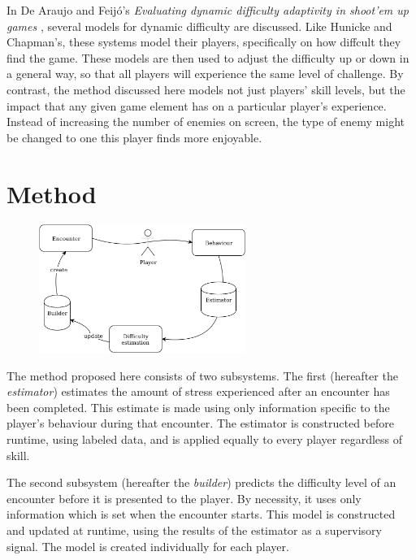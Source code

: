 \documentclass[a4paper]{article}
\begin{document}
\begin{multicols*}{2}
In De Araujo and Feij\'o's \emph{Evaluating dynamic difficulty adaptivity in shoot’em up games} \cite{shootemup}, several models for dynamic difficulty are discussed. Like Hunicke and Chapman's, these systems model their players, specifically on how diffcult they find the game. These models are then used to adjust the difficulty up or down in a general way, so that all players will experience the same level of challenge. By contrast, the method discussed here models not just players' skill levels, but the impact that any given game element has on a particular player's experience. Instead of increasing the number of enemies on screen, the type of enemy might be changed to one this player finds more enjoyable.

\section{Method}
\begin{figure}[t]
\centering
\includegraphics[width=0.60\textwidth]{processflowchart}
\end{figure}

The method proposed here consists of two subsystems. The first (hereafter the \emph{estimator}) estimates the amount of stress experienced after an encounter has been completed. This estimate is made using only information specific to the player's behaviour during that encounter. The estimator is constructed before runtime, using labeled data, and is applied equally to every player regardless of skill.

The second subsystem (hereafter the \emph{builder}) predicts the difficulty level of an encounter before it is presented to the player. By necessity, it uses only information which is set when the encounter starts. This model is constructed and updated at runtime, using the results of the estimator as a supervisory signal. The model is created individually for each player.


\end{multicols*}
\end{document}
